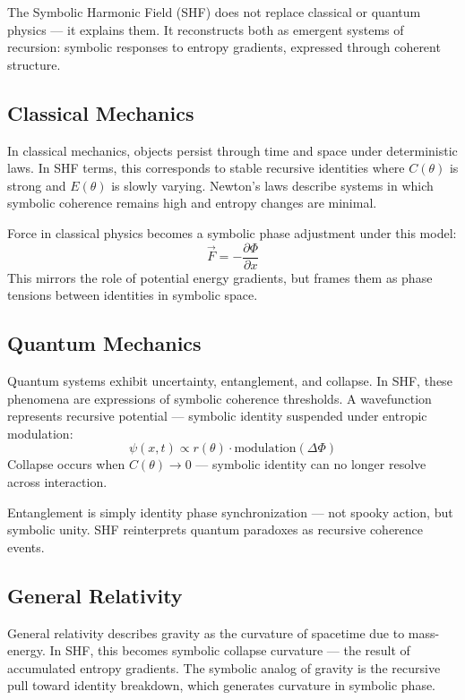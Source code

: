 \documentclass[12pt]{article}
\begin{document}
The Symbolic Harmonic Field (SHF) does not replace classical or quantum physics — it explains them. It reconstructs both as emergent systems of recursion: symbolic responses to entropy gradients, expressed through coherent structure.

\subsection*{Classical Mechanics}

In classical mechanics, objects persist through time and space under deterministic laws. In SHF terms, this corresponds to stable recursive identities where \(C(\theta)\) is strong and \(E(\theta)\) is slowly varying. Newton’s laws describe systems in which symbolic coherence remains high and entropy changes are minimal.

Force in classical physics becomes a symbolic phase adjustment under this model:
\[
\vec{F} = -\frac{\partial \Phi}{\partial x}
\]
This mirrors the role of potential energy gradients, but frames them as phase tensions between identities in symbolic space.

\subsection*{Quantum Mechanics}

Quantum systems exhibit uncertainty, entanglement, and collapse. In SHF, these phenomena are expressions of symbolic coherence thresholds. A wavefunction represents recursive potential — symbolic identity suspended under entropic modulation:
\[
\psi(x,t) \propto r(\theta) \cdot \text{modulation}(\Delta \Phi)
\]
Collapse occurs when \(C(\theta) \to 0\) — symbolic identity can no longer resolve across interaction.

Entanglement is simply identity phase synchronization — not spooky action, but symbolic unity. SHF reinterprets quantum paradoxes as recursive coherence events.

\subsection*{General Relativity}

General relativity describes gravity as the curvature of spacetime due to mass-energy. In SHF, this becomes symbolic collapse curvature — the result of accumulated entropy gradients. The symbolic analog of gravity is the recursive pull toward identity breakdown, which generates curvature in symbolic phase.
\end{document}
